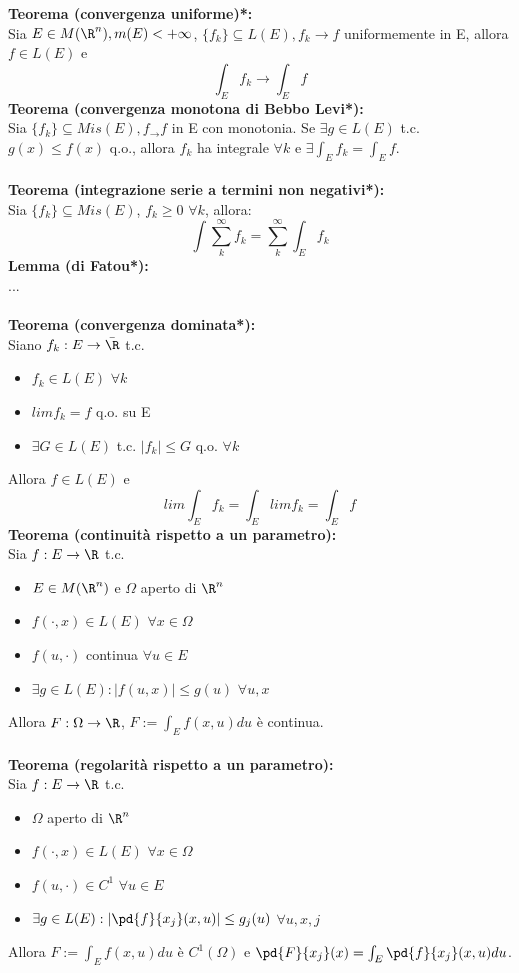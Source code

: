 \documentclass{article}
\begin{document}
\textbf{Teorema (convergenza uniforme)*:}\\
Sia $E\in M(\R^n), m(E)<+\infty$, $\{f_k\}\subseteq L(E), f_k\rightarrow f$ uniformemente in E, allora $f\in L(E)$ e $$\int_Ef_k\rightarrow\int_E f$$
\textbf{Teorema (convergenza monotona di Bebbo Levi*):}\\
Sia $\{f_k\}\subseteq Mis(E), f_\rightarrow f$ in E con monotonia. Se $\exists g\in L(E)$ t.c. $g(x)\leq f(x)$ q.o., allora $f_k$ ha integrale $\forall k$ e $\exists \int_Ef_k=\int_E f$.\\\\
\textbf{Teorema (integrazione serie a termini non negativi*):}\\
Sia $\{f_k\}\subseteq Mis(E)$, $f_k\geq0$ $\forall k$, allora:
$$ \int\sum_k^\infty f_k=\sum_k^\infty\int_E f_k $$
\textbf{Lemma (di Fatou*):}\\
...\\\\
\textbf{Teorema (convergenza dominata*):}\\
Siano $f_k:E\rightarrow\bar{\R}$ t.c.
\begin{itemize}
    \item $f_k\in L(E)$ $\forall k$
    \item $lim f_k=f$ q.o. su E
    \item $\exists G\in L(E)$ t.c. $|f_k|\leq G$ q.o. $\forall k$
\end{itemize}
Allora $f\in L(E)$ e 
$$ lim\int_Ef_k=\int_E limf_k=\int_E f $$
\textbf{Teorema (continuità rispetto a un parametro):}\\
Sia $f:E\time\Omega\rightarrow\R$ t.c.
\begin{itemize}
    \item $E\in M(\R^n)$ e $\Omega$ aperto di $\R^n$
    \item $f(\cdot,x)\in L(E)$ $\forall x\in\Omega$
    \item $f(u,\cdot)$ continua $\forall u\in E$
    \item $\exists g\in L(E):|f(u,x)|\leq g(u)$ $\forall u,x$
\end{itemize}
Allora $F:\Omega\rightarrow\R$, $F:=\int_Ef(x,u)du$ è continua.\\\\
\textbf{Teorema (regolarità rispetto a un parametro):}\\
Sia $f:E\time\Omega\rightarrow\R$ t.c.
\begin{itemize}
    \item $\Omega$ aperto di $\R^n$
    \item $f(\cdot,x)\in L(E)$ $\forall x\in\Omega$
    \item $f(u,\cdot)\in C^1$ $\forall u\in E$
    \item $\exists g\in L(E):|\pd{f}{x_j}(x,u)|\leq g_j(u)$ $\forall u,x,j$
\end{itemize}
Allora $F:=\int_Ef(x,u)du$ è $C^1(\Omega)$ e $\pd{F}{x_j}(x)=\int_E\pd{f}{x_j}(x,u)du$.\\\\
\end{document}
